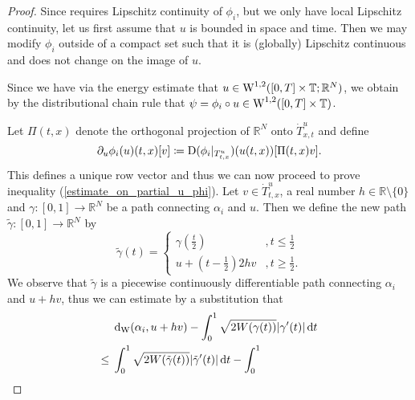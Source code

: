\begin{proof}
	Since  requires Lipschitz continuity of $ \phi_{ i } $, but we only have local Lipschitz continuity, let us first assume that $ u $ is bounded in space and time. Then we may modify $ \phi_{ i } $ outside of a compact set such that it is (globally) Lipschitz continuous and does not change on the image of $ u $.
	
	Since we have via the energy estimate that $ u \in \operatorname{W}^{ 1 , 2 } ( [ 0 , T ] \times \operatorname{\mathbb{T}} ; \mathbb{ R }^{ N } ) $, we obtain by the distributional chain rule  that $ \psi = \phi_{ i } \circ u \in \operatorname{W}^{ 1 , 2 } ( [ 0, T ] \times \operatorname{\mathbb{T}} ) $.
	
	Let $ \Pi ( t , x ) $ denote the orthogonal projection of $ \mathbb{ R }^{ N } $ onto $ \dot{ T }_{ x, t }^{ u } $ and define 
	\begin{equation*}
		\partial_{ u } \phi_{ i } ( u ) ( t, x ) [ v ]
		\coloneqq
		\operatorname{D} ( \phi_{ i } |_{ T_{ t , x }^{ u } } ) ( u ( t , x ) ) [ \Pi ( t , x ) v ].
	\end{equation*}
	This defines a unique row vector and thus we can now proceed to prove inequality (\ref{estimate_on_partial_u_phi}).
	Let $ v \in \dot{ T }_{ t, x }^{ u } $, a real number $ h \in \mathbb{ R } \setminus \{ 0 \} $ and $ \gamma \colon [ 0 , 1 ] \to \mathbb{ R }^{ N } $ be a path connecting $ \alpha_{ i } $ and $ u $. Then we define the new path $ \tilde{ \gamma } \colon [ 0 , 1 ] \to \mathbb{ R }^{ N } $ by 
	\begin{equation*}
		\tilde{ \gamma } ( t ) =
		\begin{cases}
			\gamma ( \frac{ t }{ 2 } ) 
			& , t \leq \frac{ 1 }{ 2 }
			\\
			u + 
			\left( t - \frac{ 1 }{ 2 } \right)
			2 h v
			&, t \geq \frac{ 1 }{ 2 }.
		\end{cases}
	\end{equation*}
	We observe that $ \tilde{ \gamma } $ is a piecewise continuously differentiable path connecting $ \alpha_{i } $ and $ u + h v $, thus we can estimate by a substitution that
	\begin{align*}
		& \geodesic_distance ( \alpha_{ i } , u + hv )
		-
		\int_{ 0 }^{ 1 }
			\sqrt{
				2 W ( \gamma ( t ) ) }
			\abs{ \gamma ' ( t ) }
		\dd{ t }
		\\
		\leq {} &
		\int_{ 0 }^{ 1 }
			\sqrt{ 2 W ( \tilde{ \gamma } ( t ) ) } 
			\abs{ \tilde{ \gamma } ' ( t ) }
		\dd{ t }
		-
		\int_{ 0 }^{ 1 }

\end{align*}
\end{proof}
